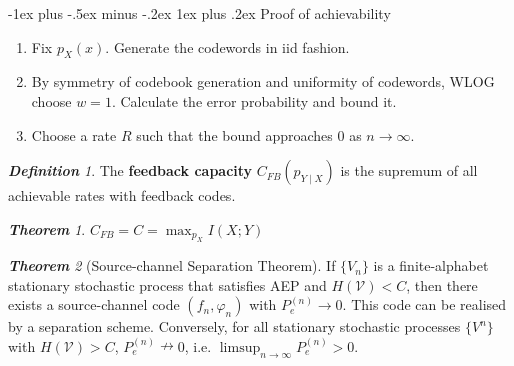 \documentclass[frenchspacing,9pt,landscape,a4paper]{article}
\makeatletter
\renewcommand{\subsubsection}{\@startsection{subsubsection}{3}{0mm}%
                                {-1ex plus -.5ex minus -.2ex}%
                                {1ex plus .2ex}%
                                {\normalfont\small\bfseries}}
\theoremstyle{remark}
\newtheorem*{thm}{\textbf{Theorem}}
\newtheorem*{defn}{\textbf{Definition}}
\makeatother
\begin{document}
\begin{multicols}{4}
\subsubsection{Proof of achievability}
\begin{enumerate}
    \item Fix $p_X(x)$. Generate the codewords in iid fashion.
    \item By symmetry of codebook generation and uniformity of codewords, WLOG choose $w=1$. Calculate the
        error probability and bound it.
    \item Choose a rate $R$ such that the bound approaches 0 as  $n\to\infty$.
\end{enumerate}
\begin{defn}
    The \textbf{feedback capacity} $C_{FB}(p_{Y\mid X})$ is the supremum of all achievable rates with
    feedback codes.
\end{defn}
\begin{thm}
    $C_{FB}=C=\max_{p_X} I(X;Y)$
\end{thm}
\begin{thm}[Source-channel Separation Theorem]
    If $\{V_n\}$ is a finite-alphabet stationary stochastic process that satisfies AEP and
    $H(\mathcal{V})<C$, then there exists a source-channel code  $(f_n,\varphi_n)$ with  $P_e^{(n)}\to 0$.
    This code can be realised by a separation scheme. Conversely, for all stationary stochastic processes
    $\{V^n\}$ with  $H(\mathcal{V})>C$,  $P_e^{(n)}\nrightarrow 0$, i.e.
    $\limsup_{n\to\infty}P_e^{(n)}>0$.
\end{thm}
\end{multicols}
\end{document}
